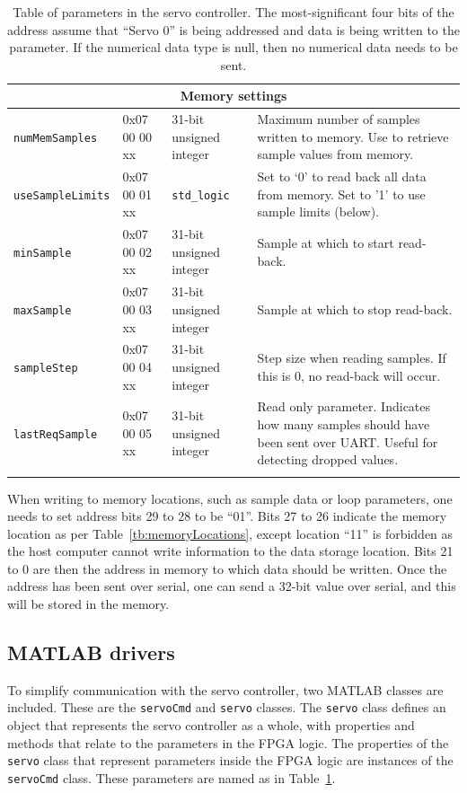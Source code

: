 \documentclass{article}
\begin{document}
\begin{longtable}[c]{|l|l|l|p{6cm}|}
	\multicolumn{4}{|c|}{\textbf{Memory settings}}\\
	\hline
	\verb|numMemSamples|	&0x07 00 00 xx					&31-bit unsigned integer	&Maximum number of samples written to memory.  Use to retrieve sample values from memory.\\\hline
	\verb|useSampleLimits|	&0x07 00 01 xx					&\verb|std_logic|			&Set to `0' to read back all data from memory.  Set to '1' to use sample limits (below).\\\hline
	\verb|minSample|		&0x07 00 02 xx					&31-bit unsigned integer	&Sample at which to start read-back.\\\hline
	\verb|maxSample|		&0x07 00 03 xx					&31-bit unsigned integer	&Sample at which to stop read-back.\\\hline
	\verb|sampleStep|		&0x07 00 04 xx					&31-bit unsigned integer	&Step size when reading samples.  If this is 0, no read-back will occur.\\\hline
	\verb|lastReqSample|	&0x07 00 05 xx					&31-bit unsigned integer	&Read only parameter.  Indicates how many samples should have been sent over UART.  Useful for detecting dropped values.\\\hline
	
	\caption{Table of parameters in the servo controller.  The most-significant four bits of the address assume that ``Servo 0'' is being addressed and data is being written to the parameter.  If the numerical data type is null, then no numerical data needs to be sent.}
	\label{tb:Parameters}
\end{longtable}

When writing to memory locations, such as sample data or loop parameters, one needs to set address bits 29 to 28 to be ``01''.  Bits 27 to 26 indicate the memory location as per Table~\ref{tb:memoryLocations}, except location ``11'' is forbidden as the host computer cannot write information to the data storage location.  Bits 21 to 0 are then the address in memory to which data should be written.  Once the address has been sent over serial, one can send a 32-bit value over serial, and this will be stored in the memory.

\subsection{MATLAB drivers}
\label{ssec:matlab}

To simplify communication with the servo controller, two MATLAB classes are included.  These are the \verb|servoCmd| and \verb|servo| classes.  The \verb|servo| class defines an object that represents the servo controller as a whole, with properties and methods that relate to the parameters in the FPGA logic.  The properties of the \verb|servo| class that represent parameters inside the FPGA logic are instances of the \verb|servoCmd| class.  These parameters are named as in Table~\ref{tb:Parameters}.
\end{document}
